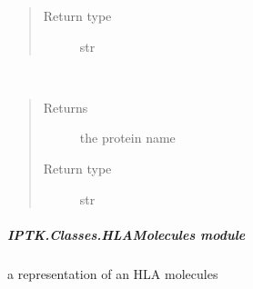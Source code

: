 \documentclass[letterpaper,10pt,english]{sphinxmanual}
\begin{document}
\begin{fulllineitems}
\begin{fulllineitems}
\begin{quote}
\begin{description}
\item[{Return type}] \leavevmode
str

\end{description}\end{quote}

\end{fulllineitems}


\begin{fulllineitems}
\label{\detokenize{IPTK.Classes:IPTK.Classes.HLAChain.HLAChain.get_protein_group}}~\begin{quote}\begin{description}
\item[{Returns}] \leavevmode
the protein name

\item[{Return type}] \leavevmode
str

\end{description}\end{quote}

\end{fulllineitems}


\end{fulllineitems}



\subparagraph{IPTK.Classes.HLAMolecules module}
\label{\detokenize{IPTK.Classes:module-IPTK.Classes.HLAMolecules}}\label{\detokenize{IPTK.Classes:iptk-classes-hlamolecules-module}}
a representation of an HLA molecules
\end{document}
